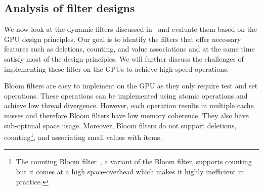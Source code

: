 
\iffalse

\subsection{Analysis of filter designs}

We now look at the dynamic filters discussed in~ and evaluate
them based on the GPU design principles.  Our goal is to identify the filters
that offer necessary features such as deletions, counting, and value
associations and at the same time satisfy most of the design principles.  We
will further discuss the challenges of implementing these filter on the GPUs to
achieve high speed operations.

Bloom filters are easy to implement on the GPU as they only require test and set
operations. These operations can be implemented using atomic operations and
achieve low thread divergence. However, each operation results in multiple cache
misses and therefore Bloom filters have low memory coherence. They also have
sub-optimal space usage. Moreover, Bloom filters do not support deletions,
counting\footnote{The counting Bloom filter~\cite{FanCaAl00}, a variant of the
Bloom filter, supports counting but it comes at a high space-overhead which
makes it highly inefficient in practice.}, and associating small values with
items.

